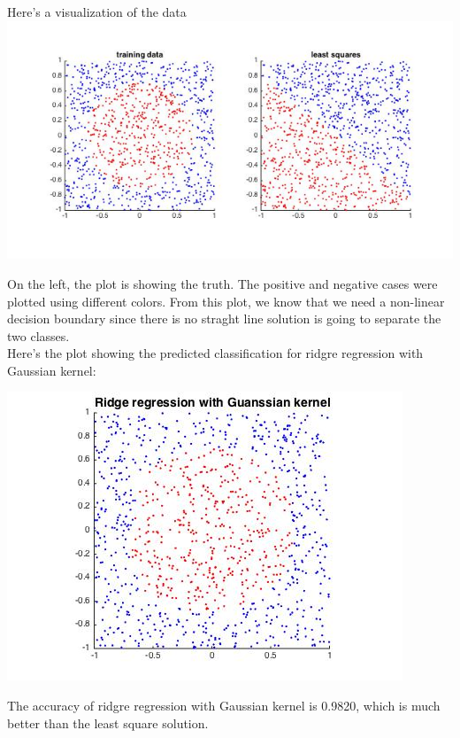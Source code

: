 \documentclass[paper=a4, fontsize=11pt]{scrartcl} %
\numberwithin{equation}{section} %
\numberwithin{figure}{section} %
\numberwithin{table}{section} %
\begin{document}
Here's a visualization of the data\\ 

\includegraphics[scale=.8]{hw8_2_truth.jpg}

On the left, the plot is showing the truth. The positive and negative cases were plotted using different colors. From this plot, we know that we need a non-linear decision boundary since there is no straght line solution is going to separate the two classes. \\

\newpage
Here's the plot showing the predicted classification for ridgre regression with Gaussian kernel: 
\begin{center}
\includegraphics[scale=.8]{hw8_2_GauKerLS.jpg}
\end{center}

The accuracy of ridgre regression with Gaussian kernel is 0.9820, which is much better than the least square solution. 
\end{document}
